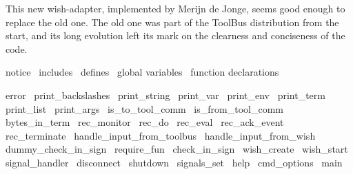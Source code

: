 

This new wish-adapter, implemented by Merijn de Jonge, seems good
enough to replace the old one. The old one was part of the ToolBus
distribution from the start, and its long evolution left its mark
on the clearness and conciseness of the code.

\endmoddef\let\nwnotused=\nwoutput{}\nwstartdeflinemarkup\nwenddeflinemarkup
\LA{}notice~{\nwtagstyle{}}\RA{}
\LA{}includes~{\nwtagstyle{}}\RA{}
\LA{}defines~{\nwtagstyle{}}\RA{}
\LA{}global variables~{\nwtagstyle{}}\RA{}
\LA{}function declarations~{\nwtagstyle{}}\RA{}

\LA{}error~{\nwtagstyle{}}\RA{}
\LA{}print_backslashes~{\nwtagstyle{}}\RA{}
\LA{}print_string~{\nwtagstyle{}}\RA{}
\LA{}print_var~{\nwtagstyle{}}\RA{}
\LA{}print_env~{\nwtagstyle{}}\RA{}
\LA{}print_term~{\nwtagstyle{}}\RA{}
\LA{}print_list~{\nwtagstyle{}}\RA{}
\LA{}print_args~{\nwtagstyle{}}\RA{}
\LA{}is_to_tool_comm~{\nwtagstyle{}}\RA{}
\LA{}is_from_tool_comm~{\nwtagstyle{}}\RA{}
\LA{}bytes_in_term~{\nwtagstyle{}}\RA{}
\LA{}rec_monitor~{\nwtagstyle{}}\RA{}
\LA{}rec_do~{\nwtagstyle{}}\RA{}
\LA{}rec_eval~{\nwtagstyle{}}\RA{}
\LA{}rec_ack_event~{\nwtagstyle{}}\RA{}
\LA{}rec_terminate~{\nwtagstyle{}}\RA{}
\LA{}handle_input_from_toolbus~{\nwtagstyle{}}\RA{}
\LA{}handle_input_from_wish~{\nwtagstyle{}}\RA{}
\LA{}dummy_check_in_sign~{\nwtagstyle{}}\RA{}
\LA{}require_fun~{\nwtagstyle{}}\RA{}
\LA{}check_in_sign~{\nwtagstyle{}}\RA{}
\LA{}wish_create~{\nwtagstyle{}}\RA{}
\LA{}wish_start~{\nwtagstyle{}}\RA{}
\LA{}signal_handler~{\nwtagstyle{}}\RA{}
\LA{}disconnect~{\nwtagstyle{}}\RA{}
\LA{}shutdown~{\nwtagstyle{}}\RA{}
\LA{}signals_set~{\nwtagstyle{}}\RA{}
\LA{}help~{\nwtagstyle{}}\RA{}
\LA{}cmd_options~{\nwtagstyle{}}\RA{}
\LA{}main~{\nwtagstyle{}}\RA{}

